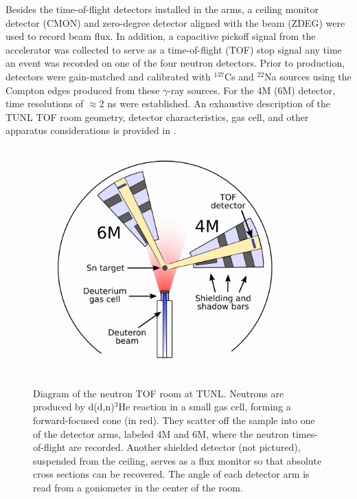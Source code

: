 Besides the time-of-flight detectors installed in the arms, a ceiling monitor
detector (CMON) and zero-degree detector aligned with the beam (ZDEG) were used
to record beam flux. In addition, a capacitive pickoff signal
from the accelerator was collected to serve as a time-of-flight
(TOF) stop signal any time an event was recorded on one of the four neutron
detectors. Prior to production, detectors were gain-matched and calibrated with $^{137}$Cs
and $^{22}$Na sources using the Compton edges produced from these $\gamma$-ray sources. For the 4M 
(6M) detector, time resolutions of $\approx$2 ns were established.
An exhaustive description of the TUNL TOF room geometry, detector characteristics,
gas cell, and other apparatus considerations is provided in \cite{GussPhDThesis}.
\begin{figure}[h]
    \centering
    \includegraphics[width = 0.9\textwidth]{figures/ExperimentalSetupTUNL.png}
    \caption[Diagram of the neutron TOF room at TUNL] 
    {
        Diagram of the neutron TOF room at TUNL. Neutrons are produced by d(d,n)$^{3}$He reaction in
        a small gas cell, forming a forward-focused cone (in red). They scatter
        off the sample into one of the detector arms, labeled 4M and 6M, where the neutron
        times-of-flight are recorded. Another shielded detector (not pictured), suspended from the 
        ceiling, serves as a flux monitor so that absolute cross sections can be
        recovered. The angle of each detector arm is read from a goniometer in
        the center of the room.
    }
    \label{ExperimentalSetupTUNL}
\end{figure}

